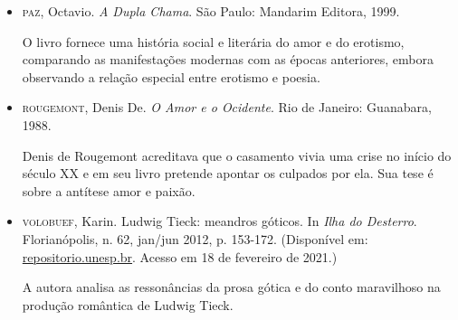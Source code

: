 \documentclass[12pt]{extarticle}
\begin{document}
\begin{itemize}
\item\textsc{paz}, Octavio. \textit{A Dupla Chama}. São Paulo: Mandarim Editora, 1999.

O livro fornece uma história social e literária do amor e do erotismo,
comparando as manifestações modernas com as épocas anteriores, embora
observando a relação especial entre erotismo e poesia.

\item\textsc{rougemont}, Denis De. \textit{O Amor e o Ocidente}. Rio de Janeiro:
Guanabara, 1988.

Denis de Rougemont acreditava que o casamento vivia uma crise no início
do século XX e em seu livro pretende apontar os culpados por ela. Sua
tese é sobre a antítese amor e paixão.

\item\textsc{volobuef}, Karin. Ludwig Tieck: meandros góticos. In \emph{Ilha
do Desterro}. Florianópolis, n. 62, jan/jun 2012, p. 153-172.
(Disponível em:
\href{https://repositorio.unesp.br/bitstream/handle/11449/73913/2-s2.0-84872003268.pdf?sequence=1\&isAllowed=y}%
{repositorio.unesp.br}.
Acesso em 18 de fevereiro de 2021.)

A autora analisa as ressonâncias da prosa gótica e do conto maravilhoso
na produção romântica de Ludwig Tieck.
\end{itemize}
\end{document}
